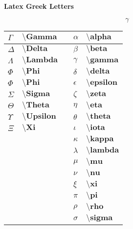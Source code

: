 \documentclass[10pt]{article}
\begin{document}
\begin{center}
\Large\textbf{Latex Greek Letters}
\end{center}
\[\gamma\]
\begin{tabular}{|l|l|l|l|l|}
\hline
$\Gamma$   &$\textbf{\textbackslash Gamma}$   &     & $\alpha$   & $\textbf{\textbackslash alpha}$   \\ \hline
$\Delta$   &$\textbf{\textbackslash Delta}$   &     & $\beta$    & $\textbf{\textbackslash beta}$    \\ \hline
$\Lambda$  &$\textbf{\textbackslash Lambda}$  &     & $\gamma$   & $\textbf{\textbackslash gamma}$   \\ \hline
$\Phi$     &$\textbf{\textbackslash Phi}$     &    & $\delta$   & $\textbf{\textbackslash delta}$   \\ \hline
$\Phi$     &$\textbf{\textbackslash Phi}$     &    & $\epsilon$ & $\textbf{\textbackslash epsilon}$ \\ \hline
$\Sigma$   & $\textbf{\textbackslash Sigma}$   &    & $\zeta$    & $\textbf{\textbackslash zeta}$    \\ \hline
$\Theta$   & $\textbf{\textbackslash Theta}$   &    & $\eta$     & $\textbf{\textbackslash eta}$     \\ \hline
$\Upsilon$ & $\textbf{\textbackslash Upsilon}$ &     & $\theta$   & $\textbf{\textbackslash theta}$   \\ \hline
$\Xi$      & $\textbf{\textbackslash Xi}$      &    & $\iota$    & $\textbf{\textbackslash iota}$    \\ \hline
$\textbf{}$   & $\textbf{}$   &    & $\kappa$   & $\textbf{\textbackslash kappa}$   \\ \hline
$\textbf{}$   & $\textbf{}$   &    & $\lambda$   & $\textbf{\textbackslash lambda}$   \\ \hline
$\textbf{}$   & $\textbf{}$   &    & $\mu$      & $\textbf{\textbackslash mu}$   \\ \hline
$\textbf{}$   & $\textbf{}$   &    & $\nu$   & $\textbf{\textbackslash nu}$   \\ \hline
$\textbf{}$   & $\textbf{}$   &    & $\xi$   & $\textbf{\textbackslash xi}$   \\ \hline
$\textbf{}$   & $\textbf{}$   &    & $\pi$   & $\textbf{\textbackslash pi}$   \\ \hline
$\textbf{}$   & $\textbf{}$   &    & $\rho$   & $\textbf{\textbackslash rho}$   \\ \hline
$\textbf{}$   & $\textbf{}$   &    & $\sigma$   & $\textbf{\textbackslash sigma}$   \\ \hline

\end{tabular}
\end{document}
